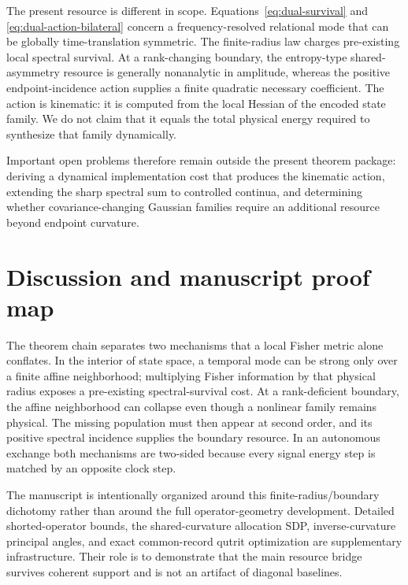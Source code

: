 \documentclass[aps,pra,preprint,nofootinbib]{revtex4-2}
\begin{document}
The present resource is different in scope.  Equations~\eqref{eq:dual-survival} and \eqref{eq:dual-action-bilateral} concern a frequency-resolved relational mode that can be globally time-translation symmetric.  The finite-radius law charges pre-existing local spectral survival.  At a rank-changing boundary, the entropy-type shared-asymmetry resource is generally nonanalytic in amplitude, whereas the positive endpoint-incidence action supplies a finite quadratic necessary coefficient.  The action is kinematic: it is computed from the local Hessian of the encoded state family.  We do not claim that it equals the total physical energy required to synthesize that family dynamically.

Important open problems therefore remain outside the present theorem package: deriving a dynamical implementation cost that produces the kinematic action, extending the sharp spectral sum to controlled continua, and determining whether covariance-changing Gaussian families require an additional resource beyond endpoint curvature.

\section{Discussion and manuscript proof map}
\label{sec:discussion}

The theorem chain separates two mechanisms that a local Fisher metric alone conflates.  In the interior of state space, a temporal mode can be strong only over a finite affine neighborhood; multiplying Fisher information by that physical radius exposes a pre-existing spectral-survival cost.  At a rank-deficient boundary, the affine neighborhood can collapse even though a nonlinear family remains physical.  The missing population must then appear at second order, and its positive spectral incidence supplies the boundary resource.  In an autonomous exchange both mechanisms are two-sided because every signal energy step is matched by an opposite clock step.

The manuscript is intentionally organized around this finite-radius/boundary dichotomy rather than around the full operator-geometry development.  Detailed shorted-operator bounds, the shared-curvature allocation SDP, inverse-curvature principal angles, and exact common-record qutrit optimization are supplementary infrastructure.  Their role is to demonstrate that the main resource bridge survives coherent support and is not an artifact of diagonal baselines.



\end{document}
